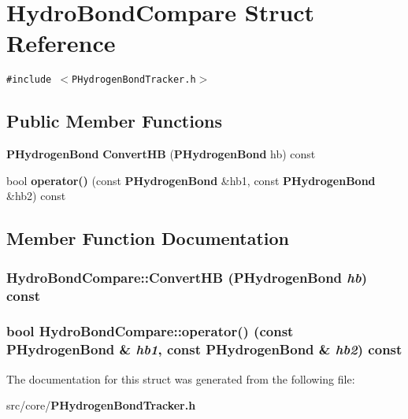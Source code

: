 \section{Hydro\-Bond\-Compare Struct Reference}
\label{structHydroBondCompare}
{\tt \#include $<$PHydrogen\-Bond\-Tracker.h$>$}

\subsection*{Public Member Functions}
\begin{CompactItemize}
\item 
{\bf PHydrogen\-Bond} {\bf Convert\-HB} ({\bf PHydrogen\-Bond} hb) const 
\item 
bool {\bf operator()} (const {\bf PHydrogen\-Bond} \&hb1, const {\bf PHydrogen\-Bond} \&hb2) const
\end{CompactItemize}


\subsection{Member Function Documentation}
\subsubsection{ Hydro\-Bond\-Compare::Convert\-HB ({\bf PHydrogen\-Bond} {\em hb}) const\hspace{0.3cm}{\tt  [inline]}}\label{structHydroBondCompare_74802e12ad87dcdacebd1ee29e0fbbb1}


\subsubsection{\setlength{\rightskip}{0pt plus 5cm}bool Hydro\-Bond\-Compare::operator() (const {\bf PHydrogen\-Bond} \& {\em hb1}, const {\bf PHydrogen\-Bond} \& {\em hb2}) const\hspace{0.3cm}{\tt  [inline]}}\label{structHydroBondCompare_d7a4ef2a45108b3625a978ec6b3182b4}




The documentation for this struct was generated from the following file:\begin{CompactItemize}
\item 
src/core/{\bf PHydrogen\-Bond\-Tracker.h}\end{CompactItemize}
